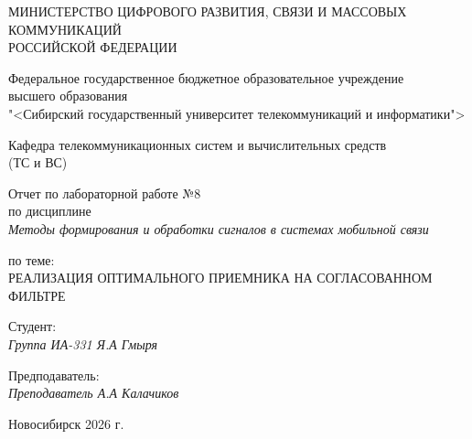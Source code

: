 \thispagestyle{empty}

\begin{center}
    МИНИСТЕРСТВО ЦИФРОВОГО РАЗВИТИЯ, СВЯЗИ И МАССОВЫХ КОММУНИКАЦИЙ \\ РОССИЙСКОЙ ФЕДЕРАЦИИ

    \vspace{20pt}

    Федеральное государственное бюджетное образовательное учреждение  \\  высшего образования \\
    "<Сибирский государственный университет телекоммуникаций и информатики"> \\

    \vspace{20pt}

    Кафедра телекоммуникационных систем и вычислительных средств \\  (ТС и ВС)
\end{center}

\vfill

\begin{center}
    Отчет по лабораторной работе №8 \\  
    по дисциплине \\
    \textit{Методы формирования и обработки сигналов в системах мобильной связи}

    \vspace{20pt}

    по теме: \\
    \uppercase{Реализация оптимального приемника на согласованном фильтре}
\end{center}

\vfill

    \noindent Студент: \\
    \textit{Группа ИА-331 \hfill Я.А Гмыря}

    \vspace{20pt}

    \noindent Предподаватель: \\
    \textit{Преподаватель \hfill А.А Калачиков}

\vfill

\begin{center}
    Новосибирск 2026 г.
\end{center}